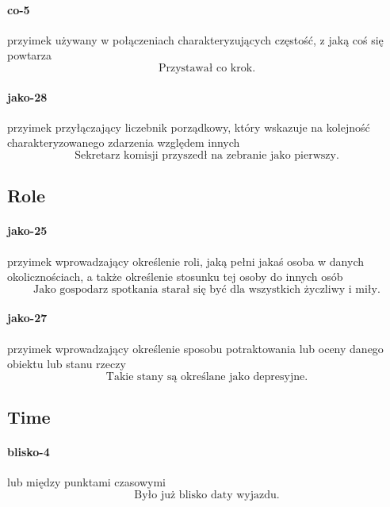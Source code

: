 \documentclass[a4paper, 12pt]{article}
\theoremstyle{remark}
\begin{document}
\paragraph{co-5} \label{prep-5}	przyimek używany w połączeniach charakteryzujących częstość, z jaką coś się powtarza
\begin{equation}
\text{Przystawał co krok.}
\end{equation}
\paragraph{jako-28} \label{prep-28}	przyimek przyłączający liczebnik porządkowy, który wskazuje na kolejność charakteryzowanego zdarzenia względem innych
\begin{equation}
\text{Sekretarz komisji przyszedł na zebranie jako pierwszy.}
\end{equation}

\subsection{Role} %
\label{sub:role}
\paragraph{jako-25} \label{prep-25}	przyimek wprowadzający określenie roli, jaką pełni jakaś osoba w danych okolicznościach, a także określenie stosunku tej osoby do innych osób
\begin{equation}
\text{Jako gospodarz spotkania starał się być dla wszystkich życzliwy i miły.}
\end{equation}
\paragraph{jako-27} \label{prep-27}	przyimek wprowadzający określenie sposobu potraktowania lub oceny danego obiektu lub stanu rzeczy
\begin{equation}
\text{Takie stany są określane jako depresyjne.}
\end{equation}

\subsection{Time} %
\label{sub:time}
\paragraph{blisko-4} \label{prep-4}	lub między punktami czasowymi
\begin{equation}
\text{Było już blisko daty wyjazdu.}
\end{equation}
\end{document}
